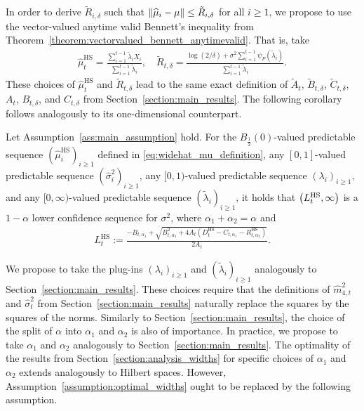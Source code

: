 In order to derive $\tilde R_{i, \delta}$ such that  $\left\| \widehat\mu_i - \mu\right\| \leq \tilde R_{i, \delta}$ for all $i \geq 1$, we propose to use the vector-valued anytime valid Bennett's inequality from Theorem~\ref{theorem:vectorvalued_bennett_anytimevalid}. That is, take 
\begin{align} \label{eq:widehat_mu_definition_hs}
    \widehat\mu_t^{\text{HS}} = \frac{\sum_{i=1}^{t-1} \tilde \lambda_i X_i}{\sum_{i=1}^{t-1} \tilde \lambda_i}, \quad \tilde R_{t, \delta} = \frac{\log(2/\delta) + \sigma^2\sum_{i=1}^{t-1} \psi_P(\tilde \lambda_i)}{\sum_{i=1}^{t-1} \tilde \lambda_i}.
\end{align}
These choices of $\widehat\mu_t^{\text{HS}}$ and $\tilde R_{t, \delta}$ lead to the same exact definition of $\tilde A_{t}$, $\tilde B_{t, \delta}$, $\tilde C_{t, \delta}$, $A_{t}$, $B_{t, \delta}$, and $C_{t, \delta}$ from Section~\ref{section:main_results}. The following corollary follows analogously to its one-dimensional counterpart.
\begin{corollary}  \label{corollary:lower_bound_hs}
    Let Assumption~\ref{ass:main_assumption} hold. For the $B_{\frac{1}{2}}(0)$-valued predictable sequence $(\widehat\mu_i^{\text{HS}})_{i \geq 1}$ defined in \eqref{eq:widehat_mu_definition}, any $[0, 1]$-valued predictable sequence $(\widehat\sigma_i^2)_{i \geq 1}$, any $[0, 1)$-valued predictable sequence $(\lambda_i)_{i \geq 1}$, and any $[0, \infty)$-valued predictable sequence $(\tilde\lambda_i)_{i \geq 1}$, it holds that $\left( L_t^{\text{HS}}, \infty\right)$ is a $1-\alpha$ lower confidence sequence for $\sigma^2$, 
    where $\alpha_1 + \alpha_2 = \alpha$ and
    \begin{align*}
        L_t^{\text{HS}} := \frac{-B_{t, \alpha_1} + \sqrt{B_{t, \alpha_1}^2 + 4A_t(D_t^{\text{HS}} - C_{t, \alpha_1} - R_{t, \alpha_2}^{\text{HS}})}}{2A_t}.
    \end{align*}
\end{corollary}

We propose to take the plug-ins $(\lambda_i)_{i \geq 1}$ and $(\tilde\lambda_i)_{i \geq 1}$ analogously to Section~\ref{section:main_results}. These choices require that the definitions of $\widehat m_{4, t}^{2}$ and $\widehat\sigma_t^2$ from Section~\ref{section:main_results} naturally replace the squares by the squares of the norms. Similarly to Section~\ref{section:main_results}, the choice of the split of $\alpha$ into $\alpha_1$ and $\alpha_2$ is also of importance. In practice, we propose to take $\alpha_1$ and $\alpha_2$ analogously to Section~\ref{section:main_results}.
The optimality of the results from Section~\ref{section:analysis_widths} for specific choices of $\alpha_1$ and $\alpha_2$ extends analogously to Hilbert spaces. However, Assumption~\ref{assumption:optimal_widths} ought to be replaced by the following assumption. 


